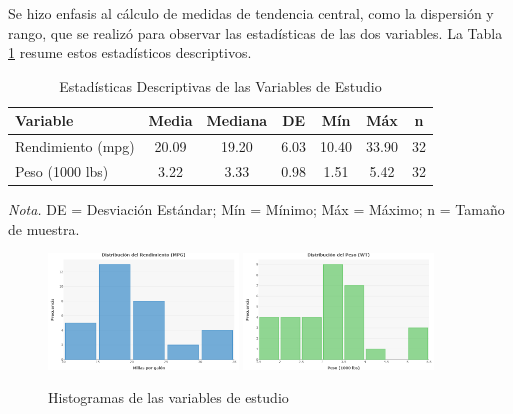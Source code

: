 \documentclass[12pt, letterpaper]{article}
\begin{document}
    Se hizo enfasis al cálculo de medidas de tendencia central, como la dispersión
    y rango, que se realizó para observar las estadísticas de las dos variables. La Tabla \ref{tab:descriptivas}
    resume estos estadísticos descriptivos.

    \begin{table}[H]
        \centering
        \caption{Estadísticas Descriptivas de las Variables de Estudio}
        \begin{tabular}{@{}lcccccc@{}}
            \toprule 
            \textbf{Variable} & \textbf{Media} & \textbf{Mediana} & \textbf{DE} & \textbf{Mín} & \textbf{Máx} & \textbf{n} \\
            \midrule 
            Rendimiento (mpg) & 20.09          & 19.20            & 6.03        & 10.40        & 33.90        & 32         \\
            Peso (1000 lbs)   & 3.22           & 3.33             & 0.98        & 1.51         & 5.42         & 32         \\
            \bottomrule
        \end{tabular}
        \label{tab:descriptivas}
        
        \vspace{0.2cm}
        \textit{Nota.} DE = Desviación Estándar; Mín = Mínimo; Máx = Máximo; n = Tamaño de muestra.
    \end{table}

    \begin{figure}[H]
        \centering
        \includegraphics[width=0.45\textwidth]{Graficos/distribuicion del rendimiento.png}
        \hfill
        \includegraphics[width=0.45\textwidth]{Graficos/distribuicion del peso.png}
        \caption{Histogramas de las variables de estudio}
        \label{fig:histogramas}
    \end{figure}
\end{document}
